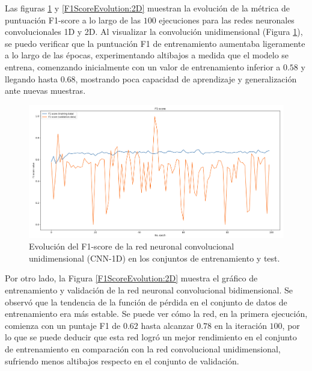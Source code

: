 \documentclass{uathesis-es}
\begin{document}
{Las figuras \ref{F1ScoreEvolution:1D} y \ref{F1ScoreEvolution:2D} muestran la evolución de la métrica de puntuación F1-score a lo largo de las $100$ ejecuciones para las redes neuronales convolucionales 1D y 2D. Al visualizar la convolución unidimensional (Figura \ref{F1ScoreEvolution:1D}), se puedo verificar que la puntuación F1 de entrenamiento aumentaba ligeramente a lo largo de las épocas, experimentando altibajos a medida que el modelo se entrena, comenzando inicialmente con un valor de entrenamiento inferior a $0.58$ y llegando hasta $0.68$, mostrando poca capacidad de aprendizaje y generalización ante nuevas muestras.

 \begin{figure}[H]
	\centering
	\includegraphics[width=14cm]{Figures/1stPaper/F1Score1D}
	\caption{Evolución del F1-score de la red neuronal convolucional unidimensional (CNN-1D) en los conjuntos de entrenamiento y test.}
	\label{F1ScoreEvolution:1D}
\end{figure}

Por otro lado, la Figura \ref{F1ScoreEvolution:2D} muestra el gráfico de entrenamiento y validación de la red neuronal convolucional bidimensional. Se observó que la tendencia de la función de pérdida en el conjunto de datos de entrenamiento era más estable. Se puede ver cómo la red, en la primera ejecución, comienza con un puntaje F1 de $0.62$ hasta alcanzar $0.78$ en la iteración $100$, por lo que se puede deducir que esta red logró un mejor rendimiento en el conjunto de entrenamiento en comparación con la red convolucional unidimensional, sufriendo menos altibajos respecto en el conjunto de validación.

}
\end{document}
